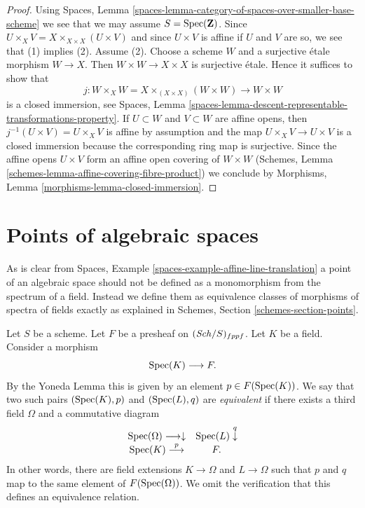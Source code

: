 \begin{proof}
Using Spaces, Lemma
\ref{spaces-lemma-category-of-spaces-over-smaller-base-scheme}
we see that we may assume $S = \operatorname{Spec}(\mathbf{Z})$.
Since $U \times_X V = X \times_{X \times X} (U \times V)$
and since $U \times V$ is affine if $U$ and $V$ are so,
we see that (1) implies (2).
Assume (2). Choose a scheme $W$ and a surjective \'etale morphism
$W \to X$. Then $W \times W \to X \times X$ is surjective \'etale.
Hence it suffices to show that
$$
j : W \times_X W = X \times_{(X \times X)} (W \times W) \to W \times W
$$
is a closed immersion, see Spaces, Lemma
\ref{spaces-lemma-descent-representable-transformations-property}.
If $U \subset W$ and $V \subset W$ are affine opens, then
$j^{-1}(U \times V) = U \times_X V$ is affine by assumption
and the map $U \times_X V \to U \times V$ is a closed immersion
because the corresponding ring map is surjective.
Since the affine opens $U \times V$ form an affine open covering
of $W \times W$
(Schemes, Lemma \ref{schemes-lemma-affine-covering-fibre-product})
we conclude by
Morphisms, Lemma \ref{morphisms-lemma-closed-immersion}.
\end{proof}

\section{Points of algebraic spaces}
\label{spaces-properties-section-points}
As is clear from
Spaces, Example \ref{spaces-example-affine-line-translation}
a point of an algebraic space should not be defined as a monomorphism
from the spectrum of a field.
Instead we define them as equivalence classes of morphisms of spectra
of fields exactly as explained in
Schemes, Section \ref{schemes-section-points}.

\medskip\noindent
Let $S$ be a scheme.
Let $F$ be a presheaf on $(\mathit{Sch}/S)_{fppf}$.
Let $K$ be a field. Consider a morphism
$$
\operatorname{Spec}(K) \longrightarrow F.
$$
By the Yoneda Lemma this is given by an
element $p \in F(\operatorname{Spec}(K))$. We say that two such
pairs $(\operatorname{Spec}(K), p)$ and $(\operatorname{Spec}(L), q)$
are {\it equivalent} if there exists
a third field $\Omega$ and a commutative diagram
$$
\begin{array}{cc}\operatorname{Spec}(\Omega) \longrightarrow\downarrow & \operatorname{Spec}(L) \overset{q}{\downarrow} \\ \operatorname{Spec}(K) \overset{p}{\longrightarrow} & F.\end{array}
$$
In other words, there are field extensions
$K \to \Omega$ and $L \to \Omega$ such that
$p$ and $q$ map to the same element
of $F(\operatorname{Spec}(\Omega))$. We omit the verification that this
defines an equivalence relation.

